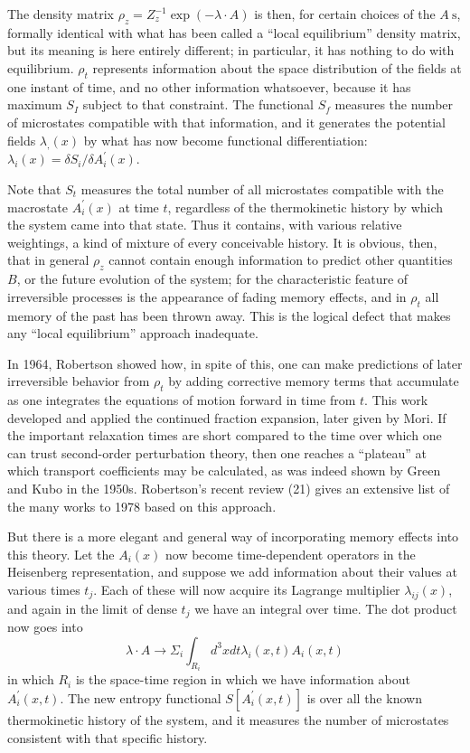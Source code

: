 \documentclass{article}
\begin{document}
The density matrix $\rho_z=Z_z^{-1} \exp (-\lambda \cdot A)$ is then, for certain choices of the $A \mathrm{~s}$, formally identical with what has been called a ``local equilibrium'' density matrix, but its meaning is here entirely different; in particular, it has nothing to do with equilibrium. $\rho_t$ represents information about the space distribution of the fields at one instant of time, and no other information whatsoever, because it has maximum $S_I$ subject to that constraint. The functional $S_f$ measures the number of microstates compatible with that information, and it generates the potential fields $\lambda_{,}(x)$ by what has now become functional differentiation: $\lambda_i(x)=\delta S_i / \delta A_i^{\prime}(x)$.

Note that $S_t$ measures the total number of all microstates compatible with the macrostate $A_i^{\prime}(x)$ at time $t$, regardless of the thermokinetic history by which the system came into that state. Thus it contains, with various relative weightings, a kind of mixture of every conceivable history. It is obvious, then, that in general $\rho_z$ cannot contain enough information to predict other quantities $B$, or the future evolution of the system; for the characteristic feature of irreversible processes is the appearance of fading memory effects, and in $\rho_t$ all memory of the past has been thrown away. This is the logical defect that makes any ``local equilibrium'' approach inadequate.

In 1964, Robertson \cite{robertson1964} showed how, in spite of this, one can make predictions of later irreversible behavior from $\rho_t$ by adding corrective memory terms that accumulate as one integrates the equations of motion forward in time from $t$. This work developed and applied the continued fraction expansion, later given by Mori. If the important relaxation times are short compared to the time over which one can trust second-order perturbation theory, then one reaches a ``plateau'' at which transport coefficients may be calculated, as was indeed shown by Green and Kubo in the 1950s. Robertson's recent review (21) gives an extensive list of the many works to 1978 based on this approach.

But there is a more elegant and general way of incorporating memory effects into this theory. Let the $A_i(x)$ now become time-dependent operators in the Heisenberg representation, and suppose we add information about their values at various times $t_j$. Each of these will now acquire its Lagrange multiplier $\lambda_{i j}(x)$, and again in the limit of dense $t_j$ we have an integral over time. The dot product now goes into
$$
\lambda \cdot A \rightarrow \Sigma_i \int_{R_i} d^3 x d t \lambda_i(x, t) A_i(x, t)
$$
in which $R_i$ is the space-time region in which we have information about $A_i^{\prime}(x, t)$. The new entropy functional $S\left[A_i^{\prime}(x, t)\right]$ is over all the known thermokinetic history of the system, and it measures the number of microstates consistent with that specific history.
\end{document}
